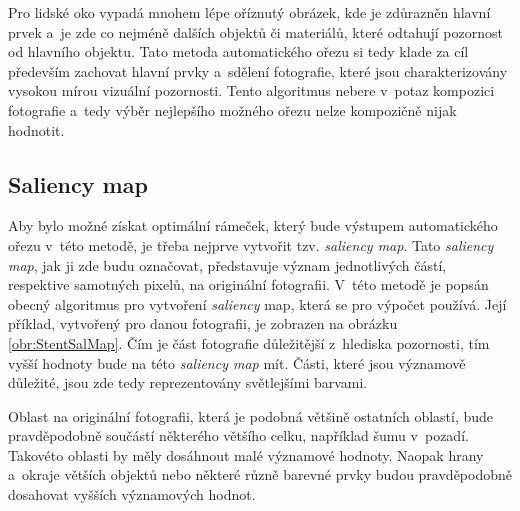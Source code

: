 Pro lidské oko vypadá mnohem lépe oříznutý obrázek, kde je zdůrazněn hlavní prvek a~je zde co nejméně dalších objektů či materiálů, které odtahují pozornost od hlavního objektu. Tato metoda automatického ořezu si tedy klade za cíl především zachovat hlavní prvky a~sdělení fotografie, které jsou charakterizovány vysokou mírou vizuální pozornosti. Tento algoritmus nebere v~potaz kompozici fotografie a~tedy výběr nejlepšího možného ořezu nelze kompozičně nijak hodnotit.

\subsection{Saliency map} 
Aby bylo možné získat optimální rámeček, který bude výstupem automatického ořezu v~této metodě, je třeba nejprve vytvořit tzv. \emph{saliency map}. Tato \emph{saliency map}, jak ji zde budu označovat, představuje význam jednotlivých částí, respektive samotných pixelů, na originální fotografii. V~této metodě je popsán obecný algoritmus pro vytvoření \emph{saliency} map, která se pro výpočet používá. Její příklad, vytvořený pro danou fotografii, je zobrazen na obrázku \ref{obr:StentSalMap}. Čím je část fotografie důležitější z~hlediska pozornosti, tím vyšší hodnoty bude na této \emph{saliency map} mít. Části, které jsou významově důležité, jsou zde tedy reprezentovány světlejšími barvami.

Oblast na originální fotografii, která je podobná většině ostatních oblastí, bude pravděpodobně součástí některého většího celku, například šumu v~pozadí. Takovéto oblasti by měly dosáhnout malé významové hodnoty. Naopak hrany a~okraje větších objektů nebo některé různě barevné prvky budou pravděpodobně dosahovat vyšších významových hodnot. 


